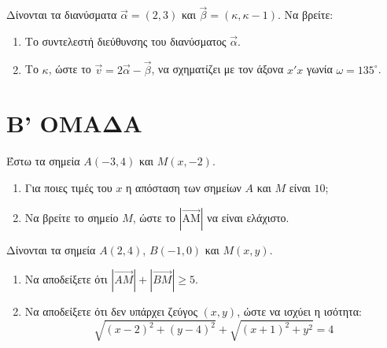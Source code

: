 \documentclass{presentation}
\begin{document}
\begin{askisi}
  Δίνονται τα διανύσματα $\vec{\alpha} = (2, 3)$ και $\vec{\beta} = (\kappa, \kappa - 1)$. Να βρείτε:
  \begin{enumerate}
    \item Το συντελεστή διεύθυνσης του διανύσματος $\vec{\alpha}$.
    \item Το $\kappa$, ώστε το $\vec{v} = 2\vec{\alpha} - \vec{\beta}$, να σχηματίζει με τον άξονα $x'x$ γωνία $\omega = 135^{\circ}$.
  \end{enumerate}
\end{askisi}

\section*{Β' ΟΜΑΔΑ}

\begin{askisi}
  Έστω τα σημεία $A(-3, 4)$ και $M(x, -2)$.
  \begin{enumerate}
    \item Για ποιες τιμές του $x$ η απόσταση των σημείων $A$ και $M$ είναι $10$;
    \item Να βρείτε το σημείο $M$, ώστε το $|\vec{\text{AM}}|$ να είναι ελάχιστο.
  \end{enumerate}
\end{askisi}

\begin{askisi}
  Δίνονται τα σημεία $A(2, 4)$, $B(-1, 0)$ και $M(x, y)$.
  \begin{enumerate}
    \item Να αποδείξετε ότι $|\overrightarrow{AM}| + |\overrightarrow{BM}| \geq 5$.
    \item Να αποδείξετε ότι δεν υπάρχει ζεύγος $(x, y)$, ώστε να ισχύει η ισότητα:
          $$\sqrt{(x - 2)^{2} + (y - 4)^{2}} + \sqrt{(x + 1)^{2} + y^{2}} = 4$$
  \end{enumerate}
\end{askisi}

\moodle
\end{document}

